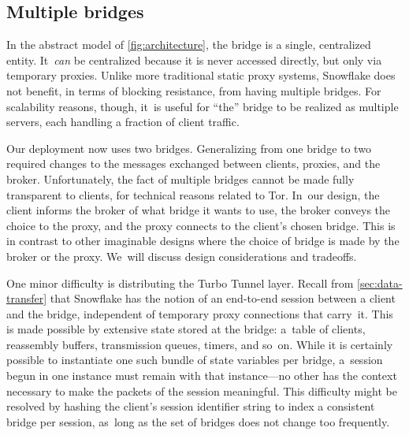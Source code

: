 \documentclass[letterpaper,twocolumn]{article}
\begin{document}
\subsection{Multiple bridges}
\label{sec:multi-bridge}


In the abstract model of \autoref{fig:architecture}, the bridge
is a single, centralized entity.
It~\emph{can} be centralized
because it is never accessed directly,
but only via temporary proxies.
Unlike more traditional static proxy systems,
Snowflake does not benefit, in terms of blocking resistance,
from having multiple bridges.
For scalability reasons, though,
it~is useful for ``the'' bridge to be realized as
multiple servers, each handling a fraction of client traffic.

Our deployment now uses two bridges.
Generalizing from one bridge to two
required changes to the messages exchanged between
clients, proxies, and the broker.
Unfortunately, the fact of multiple bridges
cannot be made fully transparent to clients,
for technical reasons related to Tor.
In~our design, the client informs the broker
of what bridge it wants to use,
the broker conveys the choice to the proxy,
and the proxy connects to the client's chosen bridge.
This is in contrast to other imaginable designs
where the choice of bridge is made
by the broker or the proxy.
We~will discuss design considerations and tradeoffs.

One minor difficulty is distributing the Turbo Tunnel layer.
Recall from \autoref{sec:data-transfer} that Snowflake
has the notion of an end-to-end session
between a client and the bridge,
independent of temporary proxy connections that carry~it.
This is made possible by extensive state stored at the bridge:
a~table of clients, reassembly buffers,
transmission queues, timers, and so~on.
While it is certainly possible to instantiate one such
bundle of state variables per bridge,
a~session begun in one instance must remain with that instance---no other
has the context necessary to make the packets
of the session meaningful.
This difficulty might be resolved by hashing
the client's session identifier string to index
a consistent bridge per session,
as~long as the set of bridges does not change too frequently.
\end{document}
